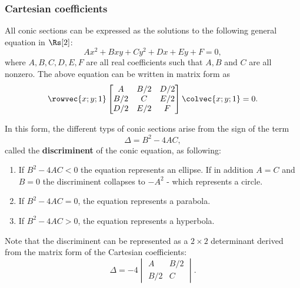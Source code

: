 \subsubsection{Cartesian coefficients}
All conic sections can be expressed as the solutions to the following general equation in $\Rs[2]$:
\begin{equation}
  Ax^{2}+Bxy+Cy^{2}+Dx+Ey+F=0,
  \label{eq:conic_section_cartesian_form}
\end{equation}
where $A, B, C, D, E, F$ are all real coefficients such that $A, B$ and $C$ are all nonzero. The above equation can be written in matrix form as
\begin{equation}
  \rowvec{x;y;1}
  \begin{bmatrix}
    A   & B/2 & D/2 \\
    B/2 &   C & E/2 \\
    D/2 & E/2 &   F
  \end{bmatrix}
  \colvec{x;y;1}=0.
  \label{eq:conic_section_cartesian_form_matrix}
\end{equation}

In this form, the different typs of conic sections arise from the sign of the term
\begin{equation}
  \Delta = B^{2}-4AC,
  \label{eq:conic_section_discriminant}
\end{equation}
called the \textbf{discriminent} of the conic equation, as following:
\begin{enumerate}
  \item If $B^{2}-4AC<0$ the equation represents an ellipse. If in addition $A=C$ and $B=0$ the discriminent collapses to $-A^{2}$ - which represents a circle.
  \item If $B^{2}-4AC=0$, the equation represents a parabola.
  \item If $B^{2}-4AC>0$, the equation represents a hyperbola.
\end{enumerate}

Note that the discriminent can be represented as a $2\times2$ determinant derived from the matrix form of the Cartesian coefficients:
\begin{equation}
  \Delta = -4\begin{vmatrix} A & B/2 \\ B/2 & C \end{vmatrix}.
  \label{eq:conic_section_discriminant_as_determinant}
\end{equation}


